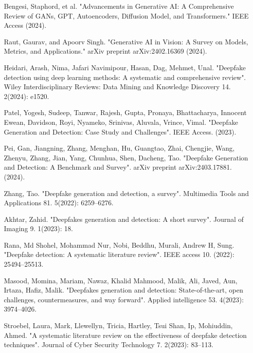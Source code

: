 \documentclass{svproc}
\begin{document}
%
%
\begin{thebibliography}{6}
%

Bengesi, Staphord, et al. "Advancements in Generative AI: A Comprehensive Review of GANs, GPT, Autoencoders, Diffusion Model, and Transformers." IEEE Access (2024).

Raut, Gaurav, and Apoorv Singh. "Generative AI in Vision: A Survey on Models, Metrics, and Applications." arXiv preprint arXiv:2402.16369 (2024).

Heidari, Arash, Nima, Jafari Navimipour, Hasan, Dag, Mehmet, Unal. "Deepfake detection using deep learning methods: A systematic and comprehensive review". Wiley Interdisciplinary Reviews: Data Mining and Knowledge Discovery 14. 2(2024): e1520.

Patel, Yogesh, Sudeep, Tanwar, Rajesh, Gupta, Pronaya, Bhattacharya, Innocent Ewean, Davidson, Royi, Nyameko, Srinivas, Aluvala, Vrince, Vimal. "Deepfake Generation and Detection: Case Study and Challenges". IEEE Access. (2023).

Pei, Gan, Jiangning, Zhang, Menghan, Hu, Guangtao, Zhai, Chengjie, Wang, Zhenyu, Zhang, Jian, Yang, Chunhua, Shen, Dacheng, Tao. "Deepfake Generation and Detection: A Benchmark and Survey". arXiv preprint arXiv:2403.17881. (2024).

Zhang, Tao. "Deepfake generation and detection, a survey". Multimedia Tools and Applications 81. 5(2022): 6259–6276.

Akhtar, Zahid. "Deepfakes generation and detection: A short survey". Journal of Imaging 9. 1(2023): 18.

Rana, Md Shohel, Mohammad Nur, Nobi, Beddhu, Murali, Andrew H, Sung. "Deepfake detection: A systematic literature review". IEEE access 10. (2022): 25494–25513.

Masood, Momina, Mariam, Nawaz, Khalid Mahmood, Malik, Ali, Javed, Aun, Irtaza, Hafiz, Malik. "Deepfakes generation and detection: State-of-the-art, open challenges, countermeasures, and way forward". Applied intelligence 53. 4(2023): 3974–4026.

Stroebel, Laura, Mark, Llewellyn, Tricia, Hartley, Tsui Shan, Ip, Mohiuddin, Ahmed. "A systematic literature review on the effectiveness of deepfake detection techniques". Journal of Cyber Security Technology 7. 2(2023): 83–113.


\end{thebibliography}
\end{document}
